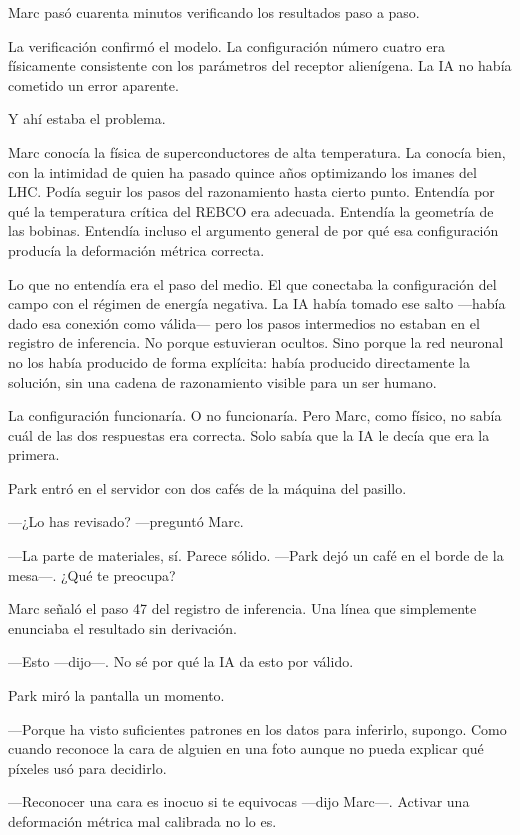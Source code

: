 \documentclass[11pt,a5paper,twoside]{book}
\begin{document}
Marc pasó cuarenta minutos verificando los resultados paso a paso.

La verificación confirmó el modelo. La configuración número cuatro era físicamente consistente con los parámetros del receptor alienígena. La IA no había cometido un error aparente.

Y ahí estaba el problema.

Marc conocía la física de superconductores de alta temperatura. La conocía bien, con la intimidad de quien ha pasado quince años optimizando los imanes del LHC. Podía seguir los pasos del razonamiento hasta cierto punto. Entendía por qué la temperatura crítica del REBCO era adecuada. Entendía la geometría de las bobinas. Entendía incluso el argumento general de por qué esa configuración producía la deformación métrica correcta.

Lo que no entendía era el paso del medio. El que conectaba la configuración del campo con el régimen de energía negativa. La IA había tomado ese salto —había dado esa conexión como válida— pero los pasos intermedios no estaban en el registro de inferencia. No porque estuvieran ocultos. Sino porque la red neuronal no los había producido de forma explícita: había producido directamente la solución, sin una cadena de razonamiento visible para un ser humano.

La configuración funcionaría. O no funcionaría. Pero Marc, como físico, no sabía cuál de las dos respuestas era correcta. Solo sabía que la IA le decía que era la primera.

Park entró en el servidor con dos cafés de la máquina del pasillo.

—¿Lo has revisado? —preguntó Marc.

—La parte de materiales, sí. Parece sólido. —Park dejó un café en el borde de la mesa—. ¿Qué te preocupa?

Marc señaló el paso 47 del registro de inferencia. Una línea que simplemente enunciaba el resultado sin derivación.

—Esto —dijo—. No sé por qué la IA da esto por válido.

Park miró la pantalla un momento.

—Porque ha visto suficientes patrones en los datos para inferirlo, supongo. Como cuando reconoce la cara de alguien en una foto aunque no pueda explicar qué píxeles usó para decidirlo.

—Reconocer una cara es inocuo si te equivocas —dijo Marc—. Activar una deformación métrica mal calibrada no lo es.
\end{document}
